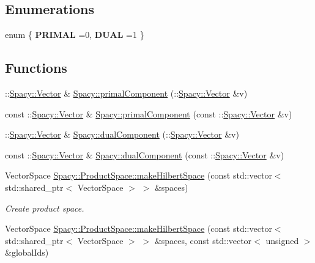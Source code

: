 \subsection*{Enumerations}
\begin{DoxyCompactItemize}
\item 
enum \{ {\bfseries P\+R\+I\+M\+AL} =0, 
{\bfseries D\+U\+AL} =1
 \}\hypertarget{group__ProductSpaceGroup_gaf65a00de69cbc808db7cddb728796894}{}\label{group__ProductSpaceGroup_gaf65a00de69cbc808db7cddb728796894}

\end{DoxyCompactItemize}
\subsection*{Functions}
\begin{DoxyCompactItemize}
\item 
\+::\hyperlink{classSpacy_1_1Vector}{Spacy\+::\+Vector} \& \hyperlink{group__ProductSpaceGroup_gaa040ba5c24284687e0df19c99dd688a6}{Spacy\+::primal\+Component} (\+::\hyperlink{classSpacy_1_1Vector}{Spacy\+::\+Vector} \&v)
\item 
const \+::\hyperlink{classSpacy_1_1Vector}{Spacy\+::\+Vector} \& \hyperlink{group__ProductSpaceGroup_ga88c5bcc74072f75c63ab7d9448f80a7e}{Spacy\+::primal\+Component} (const \+::\hyperlink{classSpacy_1_1Vector}{Spacy\+::\+Vector} \&v)
\item 
\+::\hyperlink{classSpacy_1_1Vector}{Spacy\+::\+Vector} \& \hyperlink{group__ProductSpaceGroup_gafe51c084e3b03205db94e91309e834f7}{Spacy\+::dual\+Component} (\+::\hyperlink{classSpacy_1_1Vector}{Spacy\+::\+Vector} \&v)
\item 
const \+::\hyperlink{classSpacy_1_1Vector}{Spacy\+::\+Vector} \& \hyperlink{group__ProductSpaceGroup_gabe5978657aab46b1575e2521b336407d}{Spacy\+::dual\+Component} (const \+::\hyperlink{classSpacy_1_1Vector}{Spacy\+::\+Vector} \&v)
\item 
Vector\+Space \hyperlink{group__ProductSpaceGroup_gad4b421dd4563c7d575550ab4d5d3ff0d}{Spacy\+::\+Product\+Space\+::make\+Hilbert\+Space} (const std\+::vector$<$ std\+::shared\+\_\+ptr$<$ Vector\+Space $>$ $>$ \&spaces)
\begin{DoxyCompactList}\small\item\em Create product space. \end{DoxyCompactList}\item 
Vector\+Space \hyperlink{group__ProductSpaceGroup_gaee9c55c4b0f0b9d41bb6e1eba80f829f}{Spacy\+::\+Product\+Space\+::make\+Hilbert\+Space} (const std\+::vector$<$ std\+::shared\+\_\+ptr$<$ Vector\+Space $>$ $>$ \&spaces, const std\+::vector$<$ unsigned $>$ \&global\+Ids)

\end{DoxyCompactItemize}
